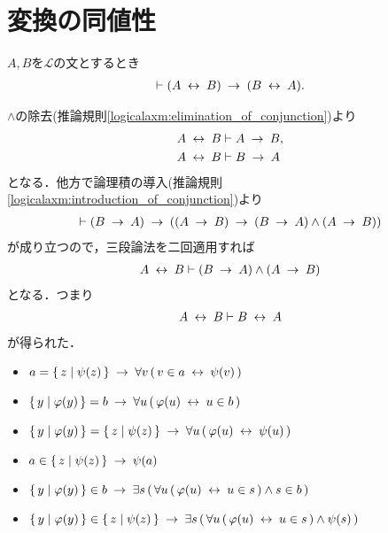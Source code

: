 \section{変換の同値性}
	\begin{screen}
		\begin{logicalthm}[同値記号の対称律]
		\label{logicalthm:symmetry_of_equivalence_arrows}
			$A,B$を$\mathcal{L}$の文とするとき
			\begin{align}
				\vdash (A \lrarrow B) \rarrow (B \lrarrow A).
			\end{align}
		\end{logicalthm}
	\end{screen}
	
	\begin{prf}
		$\wedge$の除去(推論規則\ref{logicalaxm:elimination_of_conjunction})より
		\begin{align}
			A \lrarrow B &\vdash A \rarrow B, \\
			A \lrarrow B &\vdash B \rarrow A
		\end{align}
		となる．他方で論理積の導入(推論規則\ref{logicalaxm:introduction_of_conjunction})より
		\begin{align}
			\vdash (B \rarrow A) \rarrow ((A \rarrow B) \rarrow 
			(B \rarrow A) \wedge (A \rarrow B))
		\end{align}
		が成り立つので，三段論法を二回適用すれば
		\begin{align}
			A \lrarrow B \vdash (B \rarrow A) \wedge (A \rarrow B)
		\end{align}
		となる．つまり
		\begin{align}
			A \lrarrow B \vdash B \lrarrow A
		\end{align}
		が得られた．
		\QED
	\end{prf}
	
	\begin{itemize}
		\item $a = \Set{z}{\psi(z)} \rarrow \forall v\, (\, v \in a \lrarrow \psi(v)\, )$
		\item $\Set{y}{\varphi(y)} = b \rarrow \forall u\, (\, \varphi(u) \lrarrow u \in b\, )$
		\item $\Set{y}{\varphi(y)} = \Set{z}{\psi(z)} \rarrow \forall u\, (\, \varphi(u) \lrarrow \psi(u)\, )$
		\item $a \in \Set{z}{\psi(z)} \rarrow \psi(a)$
		\item $\Set{y}{\varphi(y)} \in b
			\rarrow \exists s\, (\, \forall u\, (\, \varphi(u) \lrarrow u \in s\, )
			\wedge s \in b\, )$
		\item $\Set{y}{\varphi(y)} \in \Set{z}{\psi(z)} 
			\rarrow \exists s\, (\, \forall u\, (\, \varphi(u) \lrarrow u \in s\, )
			\wedge \psi(s)\, )$
	\end{itemize}
	
